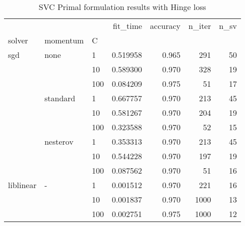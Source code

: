 \begin{table}[H]
\centering
\caption{SVC Primal formulation results with Hinge loss}
\label{primal_svc_hinge_cv_results}
\begin{tabular}{lllrrrr}
\toprule
          &   &     &  fit\_time &  accuracy &  n\_iter &  n\_sv \\
solver & momentum & C &           &           &         &       \\
\midrule
sgd & none & 1   &  0.519958 &     0.965 &     291 &    50 \\
          &   & 10  &  0.589300 &     0.970 &     328 &    19 \\
          &   & 100 &  0.084209 &     0.975 &      51 &    17 \\
          & standard & 1   &  0.667757 &     0.970 &     213 &    45 \\
          &   & 10  &  0.581267 &     0.970 &     204 &    19 \\
          &   & 100 &  0.323588 &     0.970 &      52 &    15 \\
          & nesterov & 1   &  0.353313 &     0.970 &     213 &    45 \\
          &   & 10  &  0.544228 &     0.970 &     197 &    19 \\
          &   & 100 &  0.087562 &     0.970 &      51 &    16 \\
liblinear & - & 1   &  0.001512 &     0.970 &     221 &    16 \\
          &   & 10  &  0.001837 &     0.970 &    1000 &    13 \\
          &   & 100 &  0.002751 &     0.975 &    1000 &    12 \\
\bottomrule
\end{tabular}
\end{table}
